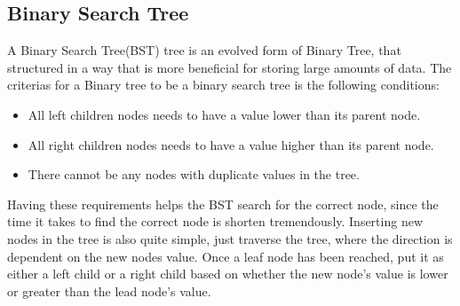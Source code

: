 \subsection{Binary Search Tree}
A Binary Search Tree(BST) tree is an evolved form of Binary Tree, that structured in a way that is more beneficial for storing large amounts of data. The criterias for a Binary tree to be a binary search tree is the following conditions:
\begin{itemize}
	\item{All left children nodes needs to have a value lower than its parent node.}
	\item{All right children nodes needs to have a value higher than its parent node.}
	\item{There cannot be any nodes with duplicate values in the tree.}
\end{itemize}
Having these requirements helps the BST search for the correct node, since the time it takes to find the correct node is shorten tremendously. Inserting new nodes in the tree is also quite simple, just traverse the tree, where the direction is dependent on the new nodes value. Once a leaf node has been reached, put it as either a left child or a right child based on whether the new node's value is lower or greater than the lead node's value.